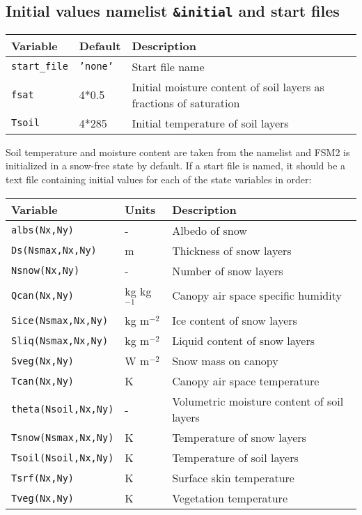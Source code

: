 \documentclass{article}
\begin{document}
\subsection*{Initial values namelist {\tt \&initial} and start files}

\begin{tabular}{|l|l|l|}
\hline
Variable          & Default & Description                                                        \\
\hline
{\tt start\_file} & {\tt 'none'}  & Start file name                                                    \\
{\tt fsat}        & 4*0.5         & Initial moisture content of soil layers as fractions of saturation \\
{\tt Tsoil}       & 4*285         & Initial temperature of soil layers                                 \\

\hline 
\end{tabular}

Soil temperature and moisture content are taken from the namelist and FSM2 is initialized in a snow-free state by default. If a start file is named, it should be a text file containing initial values for each of the state variables in order:

\begin{tabular}{|l|l|l|}
\hline
Variable    & Units        & Description                                \\
\hline
{\tt albs(Nx,Ny)}        & -            & Albedo of snow                             \\
{\tt Ds(Nsmax,Nx,Ny)}    & m            & Thickness of snow layers                   \\
{\tt Nsnow(Nx,Ny)}       & -            & Number of snow layers                      \\
{\tt Qcan(Nx,Ny)}        & kg kg$^{-1}$ & Canopy air space specific humidity         \\
{\tt Sice(Nsmax,Nx,Ny)}  & kg m$^{-2}$  & Ice content of snow layers                 \\
{\tt Sliq(Nsmax,Nx,Ny)}  & kg m$^{-2}$  & Liquid content of snow layers              \\
{\tt Sveg(Nx,Ny)}        & W m$^{-2}$   & Snow mass on canopy                        \\
{\tt Tcan(Nx,Ny)}        & K            & Canopy air space temperature               \\
{\tt theta(Nsoil,Nx,Ny)} & -            & Volumetric moisture content of soil layers \\
{\tt Tsnow(Nsmax,Nx,Ny)} & K            & Temperature of snow layers                 \\
{\tt Tsoil(Nsoil,Nx,Ny)} & K            & Temperature of soil layers                 \\
{\tt Tsrf(Nx,Ny)}        & K            & Surface skin temperature                   \\
{\tt Tveg(Nx,Ny)}        & K            & Vegetation temperature                     \\
\hline 
\end{tabular}
\end{document}
